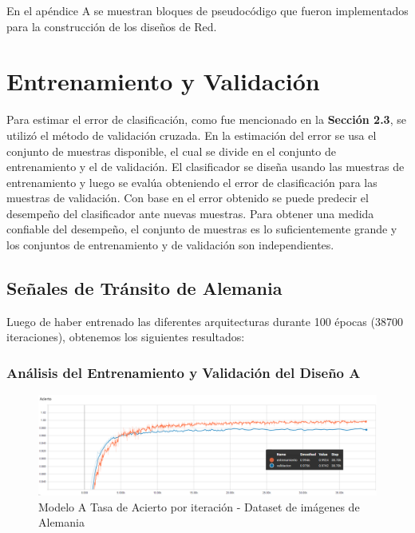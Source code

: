 			En el apéndice A se muestran bloques de pseudocódigo que fueron implementados para la construcción de los diseños de Red.
\section{Entrenamiento y Validación }

	Para estimar el error de clasificación, como fue mencionado en la \textbf{Sección 2.3}, se utilizó el método de validación cruzada. En la estimación del error se usa el conjunto de muestras disponible, el cual se divide en el conjunto de entrenamiento y el de validación. El clasificador se diseña usando las muestras de entrenamiento y luego se evalúa obteniendo el error de clasificación para las muestras de validación. Con base en el error obtenido se puede predecir el desempeño del clasificador ante nuevas muestras. Para obtener una medida confiable del desempeño, el conjunto de muestras es lo suficientemente grande y los conjuntos de entrenamiento y de validación son independientes.


	\subsection{Señales de Tránsito de Alemania}

		Luego de haber entrenado las diferentes arquitecturas durante 100 épocas (38700 iteraciones), obtenemos los siguientes resultados:
	 	\subsubsection{Análisis del Entrenamiento y Validación del Diseño A}  
			\begin{figure}[H]
				\begin{center}
				\includegraphics[width=1\textwidth]{images/desarrollo/trainResults/german/model0Acierto} 
				\end{center}
				\begin{center}
				\caption{\small{Modelo A Tasa de Acierto por iteración - Dataset de imágenes de Alemania  }}
				
				{\small{\fontsize{10}{16.8}\selectfont {Fuente: Elaboración propia}}}
				\end{center}
				\vspace{-1.5em}
			\end{figure}

